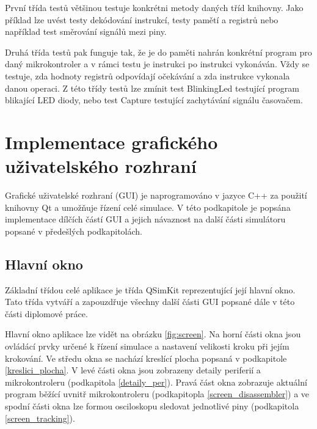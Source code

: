 První třída testů většinou testuje konkrétni metody daných tříd knihovny. Jako příklad lze uvést testy dekódování instrukcí, testy pamětí a registrů nebo například test směrování signálů mezi piny.

Druhá třída testů pak funguje tak, že je do paměti nahrán konkrétní program pro daný mikrokontroler a v rámci testu je instrukci po instrukci vykonáván. Vždy se testuje, zda hodnoty registrů odpovídají očekávání a zda instrukce vykonala danou operaci. Z této třídy testů lze zmínit test BlinkingLed testující program blikající LED diody, nebo test Capture testující zachytávání signálu časovačem.

\section{Implementace grafického uživatelského rozhraní}

Grafické uživatelské rozhraní (GUI) je naprogramováno v jazyce C++ za použití knihovny Qt a umožňuje řízení celé simulace. V této podkapitole je popsána implementace dílčích částí GUI a jejich návaznost na další části simulátoru popsané v předešlých podkapitolách.

\subsection{Hlavní okno}

Základní třídou celé aplikace je třída QSimKit reprezentující její hlavní okno. Tato třída vytváří a zapouzdřuje všechny další části GUI popsané dále v této části diplomové práce.

Hlavní okno aplikace lze vidět na obrázku \ref{fig:screen}. Na horní části okna jsou ovládácí prvky určené k řízení simulace a nastavení velikosti kroku při jejím krokování. Ve středu okna se nachází kreslící plocha popsaná v podkapitole \ref{kreslici_plocha}. V levé části okna jsou zobrazeny detaily periferií a mikrokontroleru (podkapitola \ref{detaily_per}). Pravá část okna zobrazuje aktuální program běžící uvnitř mikrokontroleru (podkapitopla \ref{screen_disassembler}) a ve spodní části okna lze formou osciloskopu sledovat jednotlivé piny (podkapitola \ref{screen_tracking}).

